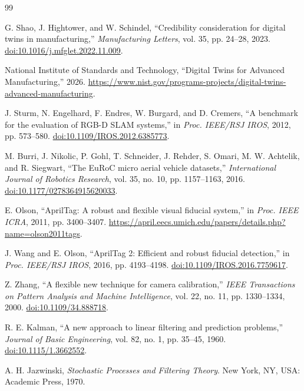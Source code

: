 \documentclass[11pt,a4paper]{article}
\begin{document}
\begin{thebibliography}{99}

G. Shao, J. Hightower, and W. Schindel,
``Credibility consideration for digital twins in manufacturing,''
\emph{Manufacturing Letters}, vol. 35, pp. 24--28, 2023.
\href{https://doi.org/10.1016/j.mfglet.2022.11.009}{doi:10.1016/j.mfglet.2022.11.009}.

National Institute of Standards and Technology,
``Digital Twins for Advanced Manufacturing,'' 2026.
\url{https://www.nist.gov/programs-projects/digital-twins-advanced-manufacturing}.

J. Sturm, N. Engelhard, F. Endres, W. Burgard, and D. Cremers,
``A benchmark for the evaluation of RGB-D SLAM systems,''
in \emph{Proc. IEEE/RSJ IROS}, 2012, pp. 573--580.
\href{https://doi.org/10.1109/IROS.2012.6385773}{doi:10.1109/IROS.2012.6385773}.

M. Burri, J. Nikolic, P. Gohl, T. Schneider, J. Rehder, S. Omari,
M. W. Achtelik, and R. Siegwart,
``The EuRoC micro aerial vehicle datasets,''
\emph{International Journal of Robotics Research}, vol. 35, no. 10,
pp. 1157--1163, 2016.
\href{https://doi.org/10.1177/0278364915620033}{doi:10.1177/0278364915620033}.

E. Olson, ``AprilTag: A robust and flexible visual fiducial system,''
in \emph{Proc. IEEE ICRA}, 2011, pp. 3400--3407.
\url{https://april.eecs.umich.edu/papers/details.php?name=olson2011tags}.

J. Wang and E. Olson, ``AprilTag 2: Efficient and robust fiducial detection,''
in \emph{Proc. IEEE/RSJ IROS}, 2016, pp. 4193--4198.
\href{https://doi.org/10.1109/IROS.2016.7759617}{doi:10.1109/IROS.2016.7759617}.

Z. Zhang, ``A flexible new technique for camera calibration,''
\emph{IEEE Transactions on Pattern Analysis and Machine Intelligence},
vol. 22, no. 11, pp. 1330--1334, 2000.
\href{https://doi.org/10.1109/34.888718}{doi:10.1109/34.888718}.

R. E. Kalman, ``A new approach to linear filtering and prediction problems,''
\emph{Journal of Basic Engineering}, vol. 82, no. 1, pp. 35--45, 1960.
\href{https://doi.org/10.1115/1.3662552}{doi:10.1115/1.3662552}.

A. H. Jazwinski, \emph{Stochastic Processes and Filtering Theory}.
New York, NY, USA: Academic Press, 1970.


\end{thebibliography}
\end{document}
